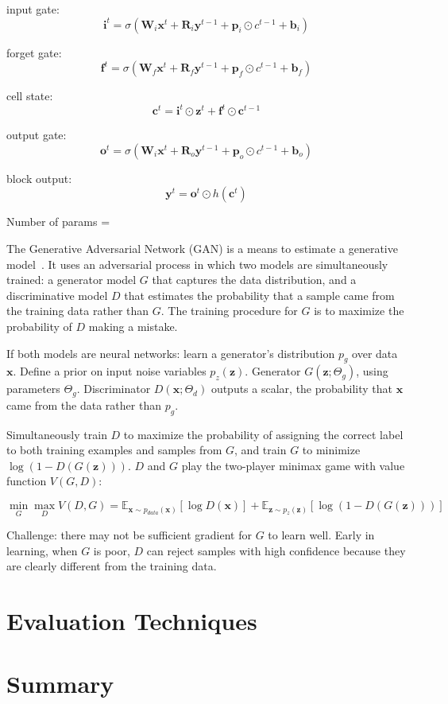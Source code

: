 input gate:
\[ \bm{i}^{t} = \sigma \left( \bm{W}_i \bm{x}^t + \bm{R}_i \bm{y}^{t-1} + \bm{p}_i \odot c^{t-1} + \bm{b}_i \right) \]

forget gate:
\[ \bm{f}^{t} = \sigma \left( \bm{W}_f \bm{x}^t + \bm{R}_f \bm{y}^{t-1} + \bm{p}_f \odot c^{t-1} + \bm{b}_f \right) \]

cell state:
\[ \bm{c}^t = \bm{i}^t \odot \bm{z}^t + \bm{f}^t \odot \bm{c}^{t-1} \]

output gate:
\[ \bm{o}^{t} = \sigma \left( \bm{W}_i \bm{x}^t + \bm{R}_o \bm{y}^{t - 1} + \bm{p}_o \odot c^{t-1} + \bm{b}_o \right) \]

block output:
\[ \bm{y}^t = \bm{o}^t \odot h(\bm{c}^t) \]

Number of params = \todo{\ldots}



The Generative Adversarial Network (GAN) is a means to estimate a generative model~\cite{Goodfellow2014}. It uses an adversarial process in which two models are simultaneously trained: a generator model $G$ that captures the data distribution, and a discriminative model $D$ that estimates the probability that a sample came from the training data rather than $G$. The training procedure for $G$ is to maximize the probability of $D$ making a mistake.

If both models are neural networks: learn a generator's distribution $p_g$ over data $\bm{x}$. Define a prior on input noise variables $p_z(\bm{z})$. Generator $G(\bm{z}; \Theta_g)$, using parameters $\Theta_g$. Discriminator $D(\bm{x}; \Theta_d)$ outputs a scalar, the probability that $\bm{x}$ came from the data rather than $p_g$. 

Simultaneously train $D$ to maximize the probability of assigning the correct label to both training examples and samples from $G$, and train $G$ to minimize $\log (1 - D(G(\bm{z})))$. $D$ and $G$ play the two-player minimax game with value function $V(G, D)$:

\[ \min_G \max_D V(D, G) = \mathbb{E}_{\bm{x} \sim  p_{data}(\bm{x})} [ \log D(\bm{x}) ] + \mathbb{E}_{\bm{z} \sim p_z(\bm{z})} [ \log (1 - D(G(\bm{z}))) ] \]

Challenge: there may not be sufficient gradient for $G$ to learn well. Early in learning, when $G$ is poor, $D$ can reject samples with high confidence because they are clearly different from the training data.

\section{Evaluation Techniques}

\section{Summary}